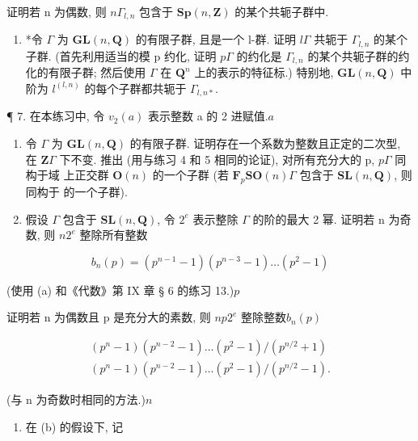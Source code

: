 证明若 n 为偶数, 则 \(n\)\(\Gamma_{l,n}\) 包含于 \(\mathbf{Sp}(n,\mathbf{Z})\) 的某个共轭子群中.

\begin{enumerate}
\def\labelenumi{(\alph{enumi})}
\setcounter{enumi}{5}
\tightlist
\item
  *令 \(\Gamma\) 为 \(\mathbf{GL}(n, \mathbf{Q})\) 的有限子群, 且是一个 l-群. 证明 \(l\)\(\Gamma\) 共轭于 \(\Gamma_{l,n}\) 的某个子群. (首先利用适当的模 p 约化, 证明 \(p\)\(\Gamma\) 的约化是 \(\Gamma_{l,n}\) 的某个共轭子群的约化的有限子群; 然后使用 \(\Gamma\) 在 \(\mathbf{Q}^{n}\) 上的表示的特征标.) 特别地, \(\mathbf{GL}(n, \mathbf{Q})\) 中阶为 \(l^{(l,n)}\) 的每个子群都共轭于 \(\Gamma_{l,n*}\).
\end{enumerate}

¶ 7. 在本练习中, 令 \(v_{2}(a)\) 表示整数 a 的 2 进赋值.\(a\)

\begin{enumerate}
\def\labelenumi{(\alph{enumi})}
\item
  令 \(\Gamma\) 为 \(\mathbf{GL}(n,\mathbf{Q})\) 的有限子群. 证明存在一个系数为整数且正定的二次型, 在 \(\mathbf{Z}\)\(\Gamma\) 下不变. 推出 (用与练习 4 和 5 相同的论证), 对所有充分大的 p, \(p\)\(\Gamma\) 同构于域  上正交群 \(\mathbf{O}(n)\) 的一个子群 (若 \(\mathbf{F}_p\)\(\mathbf{SO}(n)\)\(\Gamma\) 包含于 \(\mathbf{SL}(n,\mathbf{Q})\), 则同构于  的一个子群).
\item
  假设 \(\Gamma\) 包含于 \(\mathbf{SL}(n, \mathbf{Q})\), 令 \(2^e\) 表示整除 \(\Gamma\) 的阶的最大 2 幂. 证明若 n 为奇数, 则 \(n\)\(2^e\) 整除所有整数
\end{enumerate}

\[
b _ {n} (p) = \left(p ^ {n - 1} - 1\right) \left(p ^ {n - 3} - 1\right) \dots \left(p ^ {2} - 1\right)
\]

(使用 (a) 和《代数》第 IX 章 § 6 的练习 13.)\(p\)

证明若 n 为偶数且 p 是充分大的素数, 则 \(n\)\(p\)\(2^e\) 整除整数\(b_n(p)\)

\[
\begin{array}{l} (p ^ {n} - 1) (p ^ {n - 2} - 1) \dots (p ^ {2} - 1) / (p ^ {n / 2} + 1) \\ (p ^ {n} - 1) (p ^ {n - 2} - 1) \dots (p ^ {2} - 1) / (p ^ {n / 2} - 1). \end{array}
\]

(与 n 为奇数时相同的方法.)\(n\)

\begin{enumerate}
\def\labelenumi{(\alph{enumi})}
\setcounter{enumi}{2}
\tightlist
\item
在 (b) 的假设下, 记
\end{enumerate}

